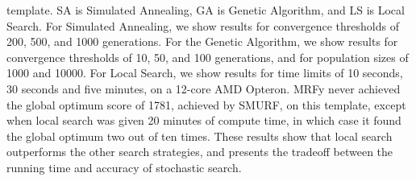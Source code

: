 \documentclass{acm_proc_article-sp}
\begin{document}
\begin{small}
\begin{table}[htb]
{template. SA is Simulated Annealing, GA is Genetic Algorithm, and LS is Local
Search. For Simulated Annealing, we show results for convergence thresholds of
200, 500, and 1000 generations. 
For the Genetic Algorithm, we show results for convergence thresholds of 10, 
50, and 100 generations, and for population sizes of 1000 and 10000.
For Local Search, we show results for time limits of 10 seconds, 30 seconds and 
five minutes, on a 12-core AMD Opteron.
MRFy never achieved the global optimum score of 1781, achieved by SMURF, on this
template, except when local search was given 20 minutes of compute time, in
which case it found the global optimum two out of ten times.
These results show that local search outperforms the other search strategies,
and presents the tradeoff between the running time and accuracy of stochastic 
search.}
\end{table}
\end{small}
\end{document}
